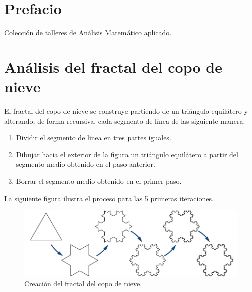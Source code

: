 \documentclass[
  a4paper,
]{scrreport}
\providecommand{\tightlist}{%
  \setlength{\itemsep}{0pt}\setlength{\parskip}{0pt}}\usepackage{longtable,booktabs,array}
\begin{document}
\hypertarget{prefacio}{%
\chapter*{Prefacio}\label{prefacio}}


Colección de talleres de Análisis Matemático aplicado.


\hypertarget{anuxe1lisis-del-fractal-del-copo-de-nieve}{%
\chapter{Análisis del fractal del copo de
nieve}\label{anuxe1lisis-del-fractal-del-copo-de-nieve}}

El fractal del copo de nieve se construye partiendo de un triángulo
equilátero y alterando, de forma recursiva, cada segmento de línea de
las siguiente manera:

\begin{enumerate}
\def\labelenumi{\arabic{enumi}.}
\tightlist
\item
  Dividir el segmento de linea en tres partes iguales.
\item
  Dibujar hacia el exterior de la figura un triángulo equilátero a
  partir del segmento medio obtenido en el paso anterior.
\item
  Borrar el segmento medio obtenido en el primer paso.
\end{enumerate}

La siguiente figura ilustra el proceso para las 5 primeras iteraciones.

\begin{figure}

{\centering \includegraphics{img/series/copo-nieve.png}

}

\caption{Creación del fractal del copo de nieve.}

\end{figure}
\end{document}
